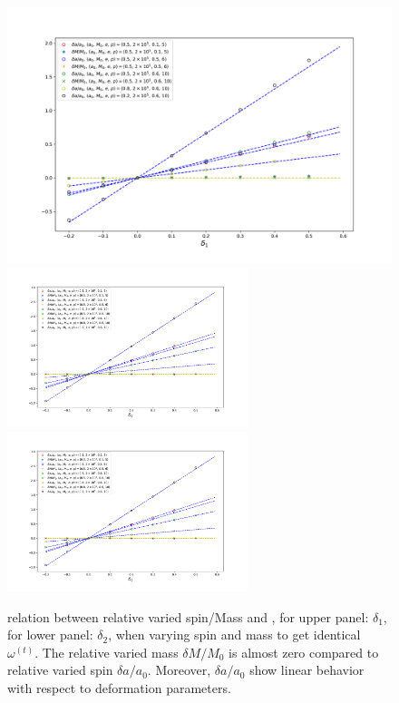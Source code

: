 \documentclass{article}
\begin{document}
	
	\begin{figure}[!htb]
		\centering
		\includegraphics[width=16cm]{d1_spin_linear.png}
		\includegraphics[width=7cm]{d2_spin_linear.png}
		\includegraphics[width=7cm]{d2_spin_linear.png}
		\caption{relation between relative varied spin/Mass and , for upper panel: $\delta_1$, for lower panel: $\delta_2$, when varying spin and mass to get identical $\omega^{(t)}$. The relative varied mass $\delta M/ M_0$ is almost zero compared to relative varied spin $\delta a/ a_0$. Moreover, $\delta a/ a_0$ show linear behavior with respect to deformation parameters.}
		\label{da_linear}
	\end{figure}
\end{document}
